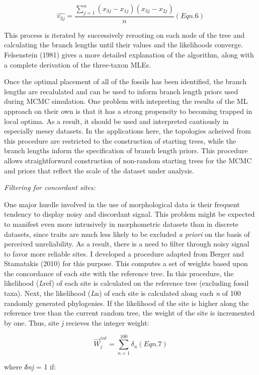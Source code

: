 \documentclass[12pt]{article}
\begin{document}
\[ \hat{v_{3j}} =   \frac{\sum\limits_{j=1}^{n}(x_{3j}- x_{1j}) (x_{3j} - x_{2j})}{n} (Eqn. 6) \]

This process is iterated by successively rerooting on each node of the
tree and calculating the branch lengths until their values and the
likelihoods converge. Felsenstein (1981) gives a more detailed
explanation of the algorithm, along with a complete derivation of the
three-taxon MLEs.

Once the optimal placement of all of the fossils has been identified,
the branch lengths are recalulated and can be used to inform branch
length priors used during MCMC simulation. One problem with intepreting
the results of the ML approach on their own is that it has a strong
propensity to becoming trapped in local optima. As a result, it should
be used and interpreted cautiously in especially messy datasets. In the
applications here, the topologies acheived from this procedure are
restricted to the construction of starting trees, while the branch
lengths inform the specification of branch length priors. This procedure
allows straightforward construction of non-random starting trees for the
MCMC and priors that reflect the scale of the dataset under analysis.

\emph{Filtering for concordant sites:}

One major hurdle involved in the use of morphological data is their
frequent tendency to display noisy and discordant signal. This problem
might be expected to manifest even more intrusively in morphometric
datasets than in discrete datasets, since traits are much less likely to
be excluded \emph{a priori} on the basis of perceived unreliability. As
a result, there is a need to filter through noisy signal to favor more
reliable sites. I developed a procedure adapted from Berger and
Stamatakis (2010) for this purpose. This computes a set of weights based
upon the concordance of each site with the reference tree. In this
procedure, the likelihood (\emph{L}ref) of each site is calculated on
the reference tree (excluding fossil taxa). Next, the likelihood
(\emph{L}n) of each site is calculated along each \emph{n} of 100
randomly generated phylogenies. If the likelihood of the site is higher
along the reference tree than the current random tree, the weight of the
site is incremented by one. Thus, site \emph{j} recieves the integer
weight:

\[\overrightarrow{W}^{int}_j = \sum\limits_{n=1}^{100}\delta_n (Eqn. 7)\]

where \emph{δnj} = 1 if:
\end{document}
